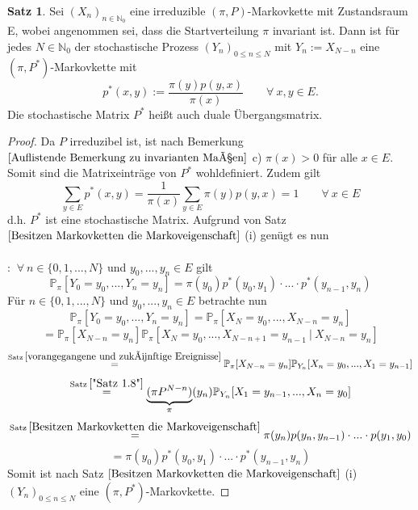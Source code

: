 \documentclass[a4paper,12pt]{scrartcl}
\theoremstyle{definition}
\newtheorem{sat}{Satz}[section]
\begin{document}
\begin{sat}
Sei $(X_{n})_{n \in \mathbb{N}_{0}}$ eine irreduzible $(\pi,P)$-Markovkette mit Zustandsraum E, wobei angenommen sei, dass die Startverteilung $\pi$ invariant ist. Dann ist für jedes $N \in \mathbb{N}_{0}$ der stochastische Prozess $(Y_{n})_{0 \leq n \leq N}$ mit $Y_{n} := X_{N-n}$ eine $(\pi,P^{*})$-Markovkette mit
\begin{equation*}
p^{*}(x,y) := \dfrac{\pi (y) p(y,x)}{\pi(x)} \qquad \forall \: x,y \in E.
\end{equation*}
Die stochastische Matrix $P^{*}$ heißt auch duale Übergangsmatrix.
\end{sat}
\begin{proof}
Da $P$ irreduzibel ist, ist nach Bemerkung $\ref{Auflistende Bemerkung zu invarianten Maßen}$ c) $\pi(x) > 0$ für alle $x \in E$. Somit sind die Matrixeinträge von $P^{*}$ wohldefiniert. Zudem gilt
\begin{equation*}
\sum_{y \in E} p^{*}(x,y) = \dfrac{1}{\pi (x)} \sum_{y \in E} \pi (y) p(y,x) = 1 \qquad \forall \: x \in E
\end{equation*}
d.h. $P^{*}$ ist eine stochastische Matrix. Aufgrund von Satz $\ref{Besitzen Markovketten die Markoveigenschaft}$ (i) genügt es nun
\\
\\
: $\: \forall \: n \in \lbrace 0,1,...,N \rbrace$ und $y_{0},...,y_{n} \in E$ gilt
\begin{equation*}
\mathbb{P}_{\pi} [Y_{0} = y_{0},...,Y_{n}=y_{n}] = \pi(y_{0})p^{*}(y_{0},y_{1}) \cdot ... \cdot p^{*}(y_{n-1},y_{n})
\end{equation*}
Für $n \in \lbrace 0,1,...,N \rbrace$ und $y_{0},...,y_{n} \in E$ betrachte nun
\begin{equation*}
\mathbb{P}_{\pi} [Y_{0} = y_{0},...,Y_{n}=y_{n}] = \mathbb{P}_{\pi} [X_{N} = y_{0},...,X_{N-n}=y_{n}] 
\end{equation*}
\begin{equation*}
= \mathbb{P}_{\pi}[X_{N-n} = y_{n}] \mathbb{P}_{\pi} [X_{N} = y_{0},...,X_{N-n+1}=y_{n-1} \: | \: X_{N-n}=y_{n}] 
\end{equation*}
\begin{equation*}
\stackrel{\mathrm{Satz} \: \ref{vorangegangene und zukünftige Ereignisse}}{=} \mathbb{P}_{\pi}[X_{N-n} = y_{n}] \mathbb{P}_{Y_{n}} [X_{n} = y_{0},...,X_{1}=y_{n-1}] 
\end{equation*}
\begin{equation*}
\stackrel{\mathrm{Satz} \: \ref{"Satz 1.8"}}{=} \underbrace{(\pi P^{N-n})}_{\pi}(y_{n}) \mathbb{P}_{Y_{n}} [X_{1} = y_{n-1},...,X_{n}=y_{0}] 
\end{equation*}
\begin{equation*}
\stackrel{\mathrm{Satz} \: \ref{Besitzen Markovketten die Markoveigenschaft}}{=} \pi(y_{n}) p(y_{n},y_{n-1}) \cdot ... \cdot p(y_{1},y_{0})
\end{equation*}
\begin{equation*}
= \pi(y_{0})p^{*}(y_{0},y_{1}) \cdot ... \cdot p^{*}(y_{n-1},y_{n})
\end{equation*}
Somit ist nach Satz $\ref{Besitzen Markovketten die Markoveigenschaft}$ (i) $(Y_{n})_{0 \leq n \leq N}$ eine $(\pi,P^{*})$-Markovkette.
\end{proof}
\end{document}
